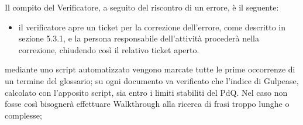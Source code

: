 Il compito del Verificatore, a seguito del riscontro di un errore, è il seguente:
\begin{itemize}
\item {} il verificatore apre un ticket per la correzione dell'errore, come descritto in sezione 5.3.1, e la persona responsabile dell'attività procederà nella correzione, chiudendo così il relativo ticket aperto.
\end{itemize}

 mediante uno script automatizzato vengono marcate tutte le prime occorrenze di un termine del glossario;
 su ogni documento va verificato che l'indice di Gulpease, calcolato con l'apposito script, sia entro i limiti stabiliti del PdQ. Nel caso non fosse così bisognerà effettuare Walkthrough alla ricerca di frasi troppo lunghe o complesse;

